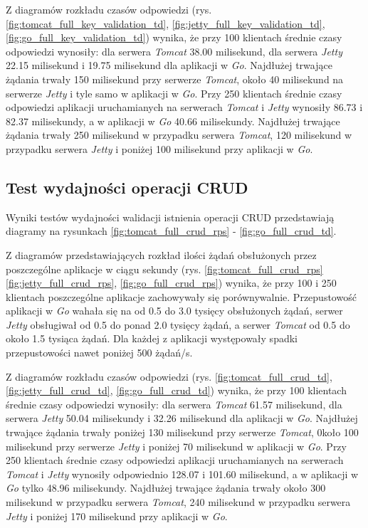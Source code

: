 Z diagramów rozkładu czasów odpowiedzi (rys. \ref{fig:tomcat_full_key_validation_td}, \ref{fig:jetty_full_key_validation_td}, \ref{fig:go_full_key_validation_td}) wynika, że przy 100 klientach średnie czasy odpowiedzi wynosiły: dla serwera \textsl{Tomcat} 38.00 milisekund, dla serwera \textsl{Jetty} 22.15 milisekund i 19.75 milisekund dla aplikacji w \textsl{Go}. Najdłużej trwające żądania trwały 150 milisekund przy serwerze  \textsl{Tomcat}, około 40 milisekund na serwerze \textsl{Jetty} i tyle samo w aplikacji w \textsl{Go}. Przy 250 klientach średnie czasy odpowiedzi aplikacji uruchamianych na serwerach \textsl{Tomcat} i \textsl{Jetty} wynosiły 86.73 i 82.37 milisekundy, a w aplikacji w \textsl{Go} 40.66 milisekundy. Najdłużej trwające żądania trwały 250 milisekund w przypadku serwera  \textsl{Tomcat}, 120 milisekund w przypadku serwera \textsl{Jetty} i poniżej 100  milisekund przy aplikacji w \textsl{Go}.


\clearpage

\subsection{Test wydajności operacji CRUD}

Wyniki testów wydajności walidacji istnienia operacji CRUD przedstawiają diagramy na rysunkach \ref{fig:tomcat_full_crud_rps} - \ref{fig:go_full_crud_td}.

Z diagramów przedstawiających rozkład ilości żądań obsłużonych przez poszczególne aplikacje w ciągu sekundy (rys. \ref{fig:tomcat_full_crud_rps} \ref{fig:jetty_full_crud_rps}, \ref{fig:go_full_crud_rps}) wynika, że przy 100 i 250 klientach poszczególne aplikacje zachowywały się porównywalnie. Przepustowość aplikacji w \textsl{Go} wahała się na od 0.5 do 3.0 tysięcy obsłużonych żądań, serwer \textsl{Jetty} obsługiwał od 0.5 do ponad 2.0 tysięcy żądań, a serwer \textsl{Tomcat} od 0.5 do około 1.5 tysiąca żądań. Dla każdej z aplikacji występowały spadki przepustowości nawet poniżej 500 żądań/s.

Z diagramów rozkładu czasów odpowiedzi (rys. \ref{fig:tomcat_full_crud_td}, \ref{fig:jetty_full_crud_td}, \ref{fig:go_full_crud_td}) wynika, że przy 100 klientach średnie czasy odpowiedzi wynosiły: dla serwera \textsl{Tomcat} 61.57 milisekund, dla serwera \textsl{Jetty} 50.04 milisekundy i 32.26 milisekund dla aplikacji w \textsl{Go}. Najdłużej trwające żądania trwały poniżej 130 milisekund przy serwerze  \textsl{Tomcat}, 0koło 100 milisekund przy serwerze \textsl{Jetty} i poniżej 70 milisekund w aplikacji w \textsl{Go}. Przy 250 klientach średnie czasy odpowiedzi aplikacji uruchamianych na serwerach \textsl{Tomcat} i \textsl{Jetty}  wynosiły odpowiednio 128.07 i 101.60 milisekund, a w aplikacji w \textsl{Go} tylko 48.96 milisekundy. Najdłużej trwające żądania trwały około 300 milisekund w przypadku serwera  \textsl{Tomcat}, 240 milisekund w przypadku serwera \textsl{Jetty} i poniżej 170 milisekund przy aplikacji w \textsl{Go}.


